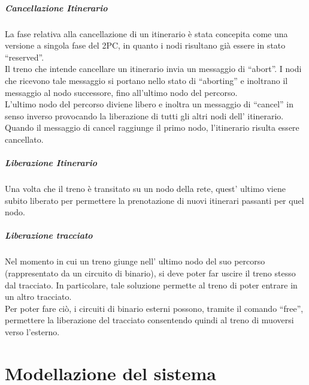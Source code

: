 \documentclass[10pt,a4paper,oneside]{report}
\begin{document}
\paragraph*{Cancellazione Itinerario}
La fase relativa alla cancellazione di un itinerario è stata concepita come una versione a singola fase del 2PC, in quanto i nodi risultano già essere in stato ``reserved''.\\
Il treno che intende cancellare un itinerario invia un messaggio di ``abort''. I nodi che ricevono tale messaggio si portano nello stato di ``aborting'' e inoltrano il messaggio al nodo successore, fino all'ultimo nodo del percorso.\\
L'ultimo nodo del percorso diviene libero e inoltra un messaggio di ``cancel'' in senso inverso provocando la liberazione di tutti gli altri nodi dell' itinerario. Quando il messaggio di cancel raggiunge il primo nodo, l'itinerario risulta essere cancellato.

\paragraph*{Liberazione Itinerario}
Una volta che il treno è transitato su un nodo della rete, quest' ultimo viene subito liberato per permettere la prenotazione di nuovi itinerari passanti per quel nodo.\\
\paragraph*{Liberazione tracciato}
Nel momento in cui un treno giunge nell' ultimo nodo del suo percorso (rappresentato da un circuito di binario), si deve poter far uscire il treno stesso dal tracciato.
In particolare, tale soluzione permette al treno di poter entrare in un altro tracciato.\\
Per poter fare ciò, i circuiti di binario esterni possono, tramite il comando ``free'', permettere la liberazione del tracciato consentendo quindi al treno di muoversi verso l'esterno.



\chapter{Modellazione del sistema}
\end{document}
